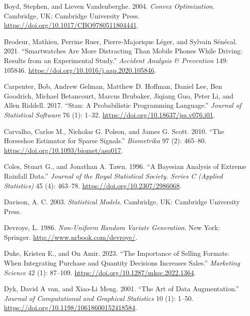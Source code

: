 \documentclass[
  11pt,
  letterpaper,
]{scrbook}
\newlength{\cslhangindent}
\newenvironment{CSLReferences}[2] %
 {\begin{list}{}{%
  \setlength{\itemindent}{0pt}
  \setlength{\leftmargin}{0pt}
  \setlength{\parsep}{0pt}
  \ifodd #1
   \setlength{\leftmargin}{\cslhangindent}
   \setlength{\itemindent}{-1\cslhangindent}
  \fi
  \setlength{\itemsep}{#2\baselineskip}}}
 {\end{list}}
\theoremstyle{definition}
\theoremstyle{definition}
\theoremstyle{definition}
\theoremstyle{plain}
\theoremstyle{plain}
\theoremstyle{plain}
\theoremstyle{remark}
\begin{document}
\begin{CSLReferences}{1}{0}
Boyd, Stephen, and Lieven Vandenberghe. 2004. \emph{Convex
Optimization}. Cambridge, UK: Cambridge University Press.
\url{https://doi.org/10.1017/CBO9780511804441}.

Brodeur, Mathieu, Perrine Ruer, Pierre-Majorique Léger, and Sylvain
Sénécal. 2021. {``Smartwatches Are More Distracting Than Mobile Phones
While Driving: Results from an Experimental Study.''} \emph{Accident
Analysis \& Prevention} 149: 105846.
\url{https://doi.org/10.1016/j.aap.2020.105846}.

Carpenter, Bob, Andrew Gelman, Matthew D. Hoffman, Daniel Lee, Ben
Goodrich, Michael Betancourt, Marcus Brubaker, Jiqiang Guo, Peter Li,
and Allen Riddell. 2017. {``{Stan}: A Probabilistic Programming
Language.''} \emph{Journal of Statistical Software} 76 (1): 1--32.
\url{https://doi.org/10.18637/jss.v076.i01}.

Carvalho, Carlos M., Nicholas G. Polson, and James G. Scott. 2010.
{``The Horseshoe Estimator for Sparse Signals.''} \emph{Biometrika} 97
(2): 465--80. \url{https://doi.org/10.1093/biomet/asq017}.

Coles, Stuart G., and Jonathan A. Tawn. 1996. {``A {B}ayesian Analysis
of Extreme Rainfall Data.''} \emph{Journal of the Royal Statistical
Society. Series C (Applied Statistics)} 45 (4): 463--78.
\url{https://doi.org/10.2307/2986068}.

Davison, A. C. 2003. \emph{Statistical Models}. Cambridge, UK: Cambridge
University Press.

Devroye, L. 1986. \emph{Non-Uniform Random Variate Generation}. New
York: Springer. \url{http://www.nrbook.com/devroye/}.

Duke, Kristen E., and On Amir. 2023. {``The Importance of Selling
Formats: When Integrating Purchase and Quantity Decisions Increases
Sales.''} \emph{Marketing Science} 42 (1): 87--109.
\url{https://doi.org/10.1287/mksc.2022.1364}.

Dyk, David A van, and Xiao-Li Meng. 2001. {``The Art of Data
Augmentation.''} \emph{Journal of Computational and Graphical
Statistics} 10 (1): 1--50.
\url{https://doi.org/10.1198/10618600152418584}.


\end{CSLReferences}
\end{document}
